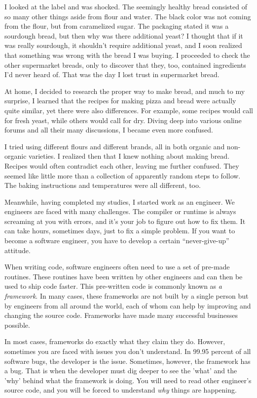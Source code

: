 I looked at the label and was shocked. The seemingly
healthy bread consisted of so many other things aside from flour and water.
The black color was not coming from the flour, but from caramelized sugar.
The packaging stated it was a sourdough bread, but then why was there additional yeast?
I thought that if it was really sourdough, it shouldn't require additional yeast, and I
soon realized that something was wrong with the bread I was buying.
I proceeded to check the other supermarket breads, only to discover that they, too,
contained ingredients I'd never heard of. That was the day I lost trust
in supermarket bread.

At home, I decided to research the proper way to make bread, and much to my surprise,
I learned that the recipes for making pizza and bread were actually quite similar, yet
there were also differences. For example, some recipes would call for fresh yeast, while
others would call for dry. Diving deep into various online forums and all their many
discussions, I became even more confused.

I tried using different flours and different brands, all in both organic and non-organic varieties.
I realized then that I knew nothing about making bread. Recipes would often contradict each other,
leaving me further confused. They seemed like little more than a collection of apparently random
steps to follow. The baking instructions and temperatures were all different, too.

Meanwhile, having completed my studies, I started work as an engineer.
We engineers are faced with many challenges. The compiler or runtime is
always screaming at you with errors, and it's your job to figure out how to fix them.
It can take hours, sometimes days, just to fix a simple problem. If you want
to become a software engineer, you have to develop a certain ``never-give-up'' attitude.

When writing code, software engineers often need to use a set of pre-made routines. These routines have been
written by other engineers and can then be used to ship code faster.
This pre-written code is commonly known as {\it a framework}. In many cases,
these frameworks are not built by a single person but by engineers from all around the world,
each of whom can help by improving and changing the source code. Frameworks have made many successful
businesses possible.

In most cases, frameworks do exactly what they claim they do. However,
sometimes you are faced with issues you don't understand. In 99.95 percent
of all software bugs, the developer is the issue. Sometimes, however, the framework has a
bug. That is when the developer must dig deeper to see the 'what' and the 'why' behind what
the framework is doing. You will need to read other engineer's source code, and you will be forced
to understand {\it why} things are happening.

